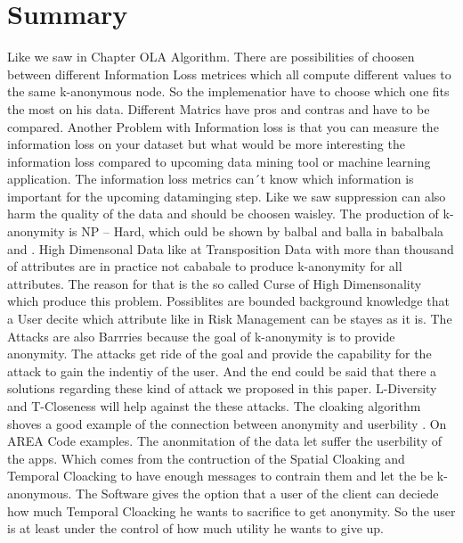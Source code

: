 \documentclass{llncs}
\begin{document}
\section{Summary}
Like we saw in Chapter OLA Algorithm. There are possibilities of choosen between different Information Loss metrices which all compute different values to the same k-anonymous node. So the implemenatior have to choose which one fits the most on his data. Different Matrics have pros and contras and have to be compared. Another Problem with Information loss is that you can measure the information loss on your dataset but what would be more interesting the information loss compared to upcoming data mining tool or machine learning application. The information loss metrics can´t know which information is important for the upcoming dataminging step. Like we saw  suppression can also harm the quality of the data and should be choosen waisley. 
The production of k-anonymity is NP – Hard, which ould be shown by balbal and balla in babalbala and .
High Dimensonal Data like at Transposition Data with more than thousand of attributes are in practice not cababale to produce k-anonymity for all attributes. The reason for that is the so called Curse of High Dimensonality which produce this problem.  Possiblites are bounded background knowledge that a User decite which attribute like in Risk Management can be stayes as it is. 
The Attacks are also Barrries because the goal of k-anonymity is to provide anonymity. The attacks get ride of the goal and provide the capability for the attack to gain the indentiy of the user. And the end could be said that there a solutions regarding these kind of attack we proposed in this paper. L-Diversity and T-Closeness will help against the these attacks.
The cloaking algorithm shoves a good example of the connection between anonymity and userbility . On AREA Code examples. The anonmitation of the data let suffer the userbility of the apps. Which comes from the contruction of the Spatial Cloaking and Temporal Cloacking to have enough messages to contrain them and let the be k-anonymous. The Software gives the option that a user of the client can deciede  how much Temporal Cloacking he wants to sacrifice to get anonymity. So the user is at least under the control of how much utility he wants to give up. 

\newpage


\end{document}
